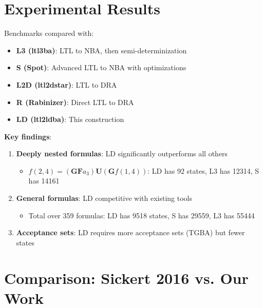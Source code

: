 \documentclass{article}
\begin{document}
\section{Experimental Results}

Benchmarks compared with:
\begin{itemize}
    \item \textbf{L3 (ltl3ba)}: LTL to NBA, then semi-determinization
    \item \textbf{S (Spot)}: Advanced LTL to NBA with optimizations
    \item \textbf{L2D (ltl2dstar)}: LTL to DRA
    \item \textbf{R (Rabinizer)}: Direct LTL to DRA
    \item \textbf{LD (ltl2ldba)}: This construction
\end{itemize}

\textbf{Key findings}:
\begin{enumerate}
    \item \textbf{Deeply nested formulas}: LD significantly outperforms all others
    \begin{itemize}
        \item $f(2,4) = (\mathbf{GF}a_3)\mathbf{U}(\mathbf{G}f(1,4))$: LD has 92 states, L3 has 12314, S has 14161
    \end{itemize}

    \item \textbf{General formulas}: LD competitive with existing tools
    \begin{itemize}
        \item Total over 359 formulas: LD has 9518 states, S has 29559, L3 has 55444
    \end{itemize}

    \item \textbf{Acceptance sets}: LD requires more acceptance sets (TGBA) but fewer states
\end{enumerate}

\section{Comparison: Sickert 2016 vs. Our Work}
\end{document}
